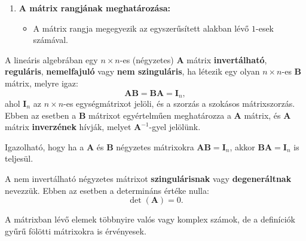 \documentclass[a4paper, 12pt]{scrartcl}
\begin{document}
\begin{blueBox}
\begin{enumerate}
    \item \textbf{A mátrix rangjának meghatározása:}
          \begin{itemize}
            \item A mátrix rangja megegyezik az egyszerűsített alakban lévő \( 1 \)-esek számával.
          \end{itemize}


  \end{enumerate}

\end{blueBox}

\begin{definition}
  A lineáris algebrában egy $n \times n$-es (négyzetes) $\mathbf{A}$ mátrix \textbf{invertálható}, \textbf{reguláris}, \textbf{nemelfajuló} vagy \textbf{nem szinguláris}, ha létezik egy olyan $n \times n$-es $\mathbf{B}$ mátrix, melyre igaz:
  \[
    \mathbf{A}\mathbf{B} = \mathbf{B}\mathbf{A} = \mathbf{I}_n,
  \]
  ahol $\mathbf{I}_n$ az $n \times n$-es egységmátrixot jelöli, és a szorzás a szokásos mátrixszorzás. Ebben az esetben a $\mathbf{B}$ mátrixot egyértelműen meghatározza a $\mathbf{A}$ mátrix, és $\mathbf{A}$ mátrix \textbf{inverzének} hívják, melyet $\mathbf{A}^{-1}$-gyel jelölünk.

  Igazolható, hogy ha a $\mathbf{A}$ és $\mathbf{B}$ négyzetes mátrixokra $\mathbf{A}\mathbf{B} = \mathbf{I}_n$, akkor $\mathbf{B}\mathbf{A} = \mathbf{I}_n$ is teljesül.

  A nem invertálható négyzetes mátrixot \textbf{szingulárisnak} vagy \textbf{degeneráltnak} nevezzük. Ebben az esetben a determináns értéke nulla:
  \[
    \det(\mathbf{A}) = 0.
  \]

  A mátrixban lévő elemek többnyire valós vagy komplex számok, de a definíciók gyűrű fölötti mátrixokra is érvényesek.

\end{definition}
\end{document}
